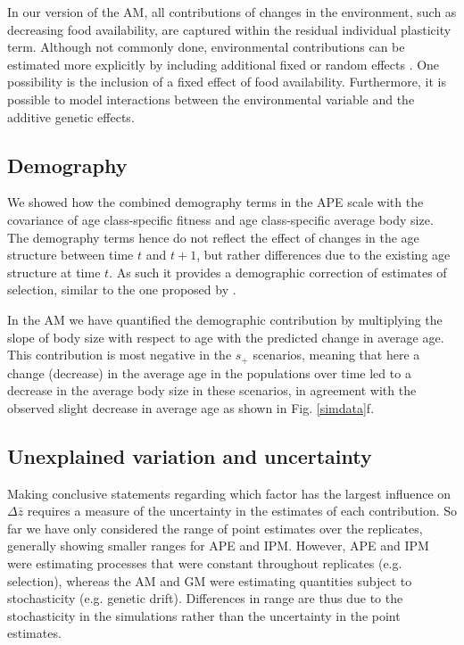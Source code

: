 In our version of the AM, all contributions of changes in the environment, such as decreasing food availability, are captured within the residual individual plasticity term. Although not commonly done, environmental contributions can be estimated more explicitly by including additional fixed or random effects \parencite{Charmantier2014book}. One possibility is the inclusion of a fixed effect of food availability. Furthermore, it is possible to model interactions between the environmental variable and the additive genetic effects. 

\subsection*{Demography}
We showed how the combined demography terms in the APE scale with the covariance of age class-specific fitness and age class-specific average body size. The demography terms hence do not reflect the effect of changes in the age structure between time $t$ and $t+1$, but rather differences due to the existing age structure at time $t$. As such it provides a demographic correction of estimates of selection, similar to the one proposed by \cite{engen2014b}.

In the AM we have quantified the demographic contribution by multiplying the slope of body size with respect to age with the predicted change in average age. This contribution is most negative in the $s_+$ scenarios, meaning that here a change (decrease) in the average age in the populations over time led to a decrease in the average body size in these scenarios, in agreement with the observed slight decrease in average age as shown in Fig. \ref{simdata}f.

\subsection*{Unexplained variation and uncertainty}
Making conclusive statements regarding which factor has the largest influence on $\Delta \overline z$ requires a measure of the uncertainty in the estimates of each contribution. So far we have only considered the range of point estimates over the replicates, generally showing smaller ranges for APE and IPM. However, APE and IPM were estimating processes that were constant throughout replicates (e.g. selection), whereas the AM and GM were estimating quantities subject to stochasticity (e.g. genetic drift). Differences in range are thus due to the stochasticity in the simulations rather than the uncertainty in the point estimates.

